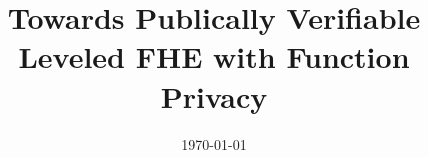 \documentclass[11pt]{article}
\newcommand{\myname}{Lev Stambler}
\begin{document}
\title{Towards Publically Verifiable Leveled FHE with Function Privacy}


\date{\today}
\newcommand{\iO}{i\mathcal{O}}
\newcommand{\Enc}[1]{\texttt{Enc}_{#1}}
\newcommand{\Dec}[1]{\texttt{Dec}_{#1}}
\newcommand{\msg}{\texttt{msg}}

\maketitle

\begin{abstract}
\end{abstract}



\end{document}
